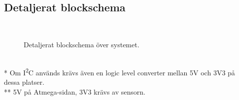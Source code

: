 \documentclass[a4paper,11pt]{article}
\begin{document}
\newpage
\begin{appendices}
\chapter{Detaljerat blockschema}
\\%
\begin{figure}[h!]
    \caption{Detaljerat blockschema över systemet.}
    \label{fig:modulesDetailed}
\end{figure}\\
* Om I\textsuperscript{2}C används krävs även en logic level converter mellan 5V och 3V3 på dessa platser.\\
** 5V på Atmega-sidan, 3V3 krävs av sensorn.

\end{appendices}
\end{document}
